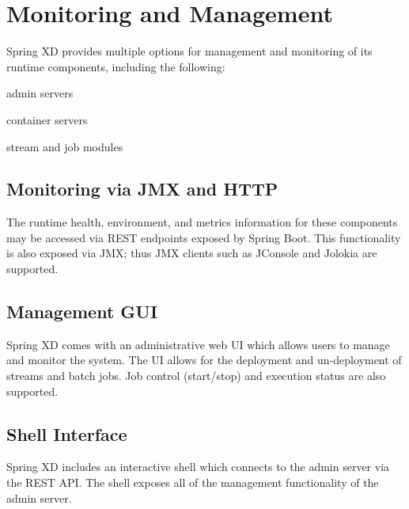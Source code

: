 \section {Monitoring and Management}
Spring XD provides multiple options for management and monitoring of
its runtime components, including the following:\begin{itemize*}
	\item admin servers
	\item container servers
	\item stream and job modules
\end{itemize*}

\subsection {Monitoring via JMX and HTTP}
The runtime health, environment, and metrics information for these components
may be accessed via REST endpoints exposed by Spring Boot\cite{spring-boot}.
This functionality is also exposed via JMX; thus JMX clients such as JConsole
and Jolokia are supported.

\subsection {Management GUI}
Spring XD comes with an administrative web UI which allows users to manage
and monitor the system. The UI allows for the deployment and un-deployment
of streams and batch jobs. Job control (start/stop) and execution status
are also supported.

\subsection {Shell Interface}
Spring XD includes an interactive shell which connects to the admin server
via the REST API. The shell exposes all of the management functionality
of the admin server.

